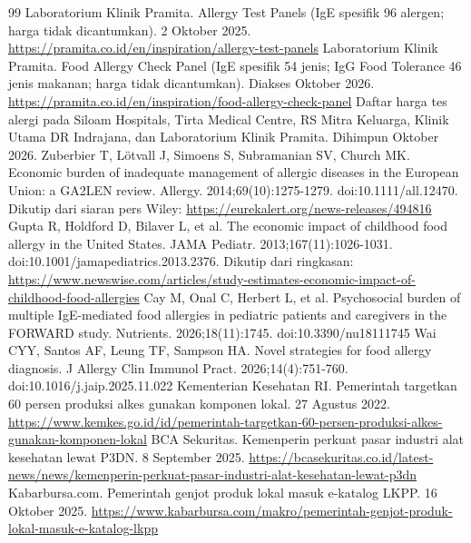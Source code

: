 \documentclass[11pt,a4paper]{article}
\begin{document}
\begin{thebibliography}{99}
 Laboratorium Klinik Pramita. Allergy Test Panels (IgE spesifik 96 alergen; harga tidak dicantumkan). 2 Oktober 2025. \url{https://pramita.co.id/en/inspiration/allergy-test-panels}
 Laboratorium Klinik Pramita. Food Allergy Check Panel (IgE spesifik 54 jenis; IgG Food Tolerance 46 jenis makanan; harga tidak dicantumkan). Diakses Oktober 2026. \url{https://pramita.co.id/en/inspiration/food-allergy-check-panel}
 Daftar harga tes alergi pada Siloam Hospitals, Tirta Medical Centre, RS Mitra Keluarga, Klinik Utama DR Indrajana, dan Laboratorium Klinik Pramita. Dihimpun Oktober 2026.
 Zuberbier T, L\"otvall J, Simoens S, Subramanian SV, Church MK. Economic burden of inadequate management of allergic diseases in the European Union: a GA2LEN review. Allergy. 2014;69(10):1275-1279. doi:10.1111/all.12470. Dikutip dari siaran pers Wiley: \url{https://eurekalert.org/news-releases/494816}
 Gupta R, Holdford D, Bilaver L, et al. The economic impact of childhood food allergy in the United States. JAMA Pediatr. 2013;167(11):1026-1031. doi:10.1001/jamapediatrics.2013.2376. Dikutip dari ringkasan: \url{https://www.newswise.com/articles/study-estimates-economic-impact-of-childhood-food-allergies}
 Cay M, Onal C, Herbert L, et al. Psychosocial burden of multiple IgE-mediated food allergies in pediatric patients and caregivers in the FORWARD study. Nutrients. 2026;18(11):1745. doi:10.3390/nu18111745
 Wai CYY, Santos AF, Leung TF, Sampson HA. Novel strategies for food allergy diagnosis. J Allergy Clin Immunol Pract. 2026;14(4):751-760. doi:10.1016/j.jaip.2025.11.022
 Kementerian Kesehatan RI. Pemerintah targetkan 60 persen produksi alkes gunakan komponen lokal. 27 Agustus 2022. \url{https://www.kemkes.go.id/id/pemerintah-targetkan-60-persen-produksi-alkes-gunakan-komponen-lokal}
 BCA Sekuritas. Kemenperin perkuat pasar industri alat kesehatan lewat P3DN. 8 September 2025. \url{https://bcasekuritas.co.id/latest-news/news/kemenperin-perkuat-pasar-industri-alat-kesehatan-lewat-p3dn}
 Kabarbursa.com. Pemerintah genjot produk lokal masuk e-katalog LKPP. 16 Oktober 2025. \url{https://www.kabarbursa.com/makro/pemerintah-genjot-produk-lokal-masuk-e-katalog-lkpp}
\end{thebibliography}
\end{document}
